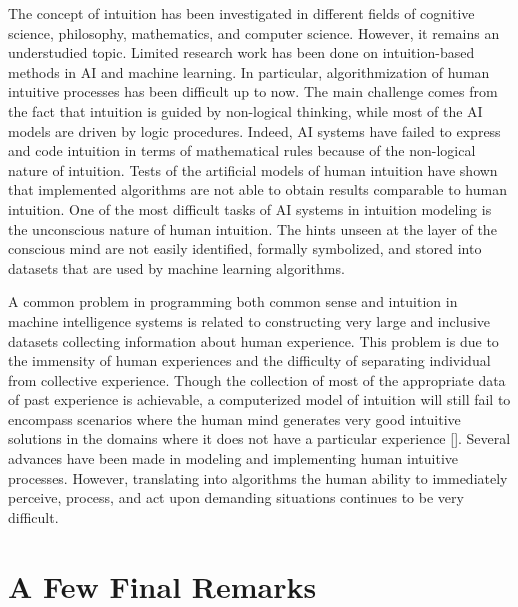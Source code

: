 The concept of intuition has been investigated in different fields of cognitive science, philosophy, mathematics, and computer science. However, it remains an understudied topic. Limited research work has been done on intuition-based methods in AI and machine learning. In particular, algorithmization of human intuitive processes has been difficult up to now. The main challenge comes from the fact that intuition is guided by non-logical thinking, while most of the AI models are driven by logic procedures. Indeed, AI systems have failed to express and code intuition in terms of mathematical rules because of the non-logical nature of intuition. Tests of the artificial models of human intuition have shown that implemented algorithms are not able to obtain results comparable to human intuition. One of the most difficult tasks of AI systems in intuition modeling is the unconscious nature of human intuition. The hints unseen at the layer of the conscious mind are not easily identified, formally symbolized, and stored into datasets that are used by machine learning algorithms.

A common problem in programming both common sense and intuition in machine intelligence systems is related to constructing very large and inclusive datasets collecting information about human experience. This problem is due to the immensity of human experiences and the difficulty of separating individual from collective experience. Though the collection of most of the appropriate data of past experience is achievable, a computerized model of intuition will still fail to encompass scenarios where the human mind generates very good intuitive solutions in the domains where it does not have a particular experience [\citealt{chap:11:Jolly:2011}]. Several advances have been made in modeling and implementing human intuitive processes. However, translating into algorithms the human ability to immediately perceive, process, and act upon demanding situations continues to be very difficult.

\section{\label{sec:11.4}A Few Final Remarks}

